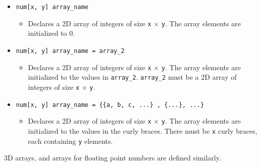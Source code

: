 \documentclass[a4paper, 11pt]{article}
\begin{document}
\begin{itemize}
\begin{itemize}
\begin{itemize}
              \end{itemize}      
              \item \texttt{num[x, y] array\_name}
              \begin{itemize}
                \item Declares a 2D array of integers of size \texttt{x} $\times$ \texttt{y}. The array elements are initialized to 0.
              \end{itemize}
              \item \texttt{num[x, y] array\_name = array\_2}
              \begin{itemize}
                \item Declares a 2D array of integers of size \texttt{x} $\times$ \texttt{y}. The array elements are initialized to the values in \texttt{array\_2}. \texttt{array\_2} must be a 2D array of integers of size \texttt{x} $\times$ \texttt{y}.
              \end{itemize}
              \item \texttt{num[x, y] array\_name = \{\{a, b, c, ...\} , \{...\}, ...\}}
              \begin{itemize}
                \item Declares a 2D array of integers of size \texttt{x} $\times$ \texttt{y}. The array elements are initialized to the values in the curly braces. There must be \texttt{x} curly braces, each containing \texttt{y} elements.
              \end{itemize}
            \end{itemize}
            3D arrays, and arrays for floating point numbers are defined similarly.


\end{itemize}
\end{document}
